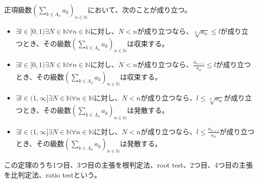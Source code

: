\documentclass[dvipdfmx]{jsarticle}
\begin{document}
\begin{thm}[根判定法と比判定法]\label{4.1.8.9}
正項級数$\left( \sum_{k \in \varLambda_{n}} a_{k} \right)_{n \in \mathbb{N}}$において、次のことが成り立つ。
\begin{itemize}
\item
  $\exists l \in [ 0,1)\exists N \in \mathbb{N}\forall n \in \mathbb{N}$に対し、$N < n$が成り立つなら、$\sqrt[n]{a_{n}} \leq l$が成り立つとき、その級数$\left( \sum_{k \in \varLambda_{n}} a_{k} \right)_{n \in \mathbb{N}}$は収束する。
\item
  $\exists l \in [ 0,1)\exists N \in \mathbb{N}\forall n \in \mathbb{N}$に対し、$N < n$が成り立つなら、$\frac{a_{n + 1}}{a_{n}} \leq l$が成り立つとき、その級数$\left( \sum_{k \in \varLambda_{n}} a_{k} \right)_{n \in \mathbb{N}}$は収束する。
\item
  $\exists l \in (1,\infty]\exists N \in \mathbb{N}\forall n \in \mathbb{N}$に対し、$N < n$が成り立つなら、$l \leq \sqrt[n]{a_{n}}$が成り立つとき、その級数$\left( \sum_{k \in \varLambda_{n}} a_{k} \right)_{n \in \mathbb{N}}$は発散する。
\item
  $\exists l \in (1,\infty]\exists N \in \mathbb{N}\forall n \in \mathbb{N}$に対し、$N < n$が成り立つなら、$l \leq \frac{a_{n + 1}}{a_{n}}$が成り立つとき、その級数$\left( \sum_{k \in \varLambda_{n}} a_{k} \right)_{n \in \mathbb{N}}$は発散する。
\end{itemize}
この定理のうち1つ目、3つ目の主張を根判定法、root test、2つ目、4つ目の主張を比判定法、ratio testという。
\end{thm}
\end{document}
